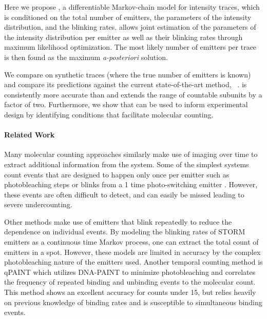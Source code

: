Here we propose \ours, a differentiable Markov-chain model for intensity
traces, which is conditioned on the total number of emitters, the parameters of
the intensity distribution, and the blinking rates.
%
  \ours allows joint estimation of the parameters of the intensity distribution
  per emitter as well as their blinking rates through maximum likelihood
  optimization.
  The most likely number of emitters per trace is then found as the maximum
  \emph{a-posteriori} solution.

We compare \ours on synthetic traces (where the true number of emitters is
known) and compare its predictions against the current state-of-the-art method,
\lbfcs~\citep{stein_calibration-free_2021}.
%
  \ours is consistently more accurate than \lbfcs and extends the range of
  countable subunits by a factor of two.
  Furthermore, we show that \ours can be used to inform experimental design by
  identifying conditions that facilitate molecular counting.

\paragraph{Related Work}

Many molecular counting approaches similarly
  make use of imaging over time to extract additional information from the
  system. Some of the simplest systems count events that are designed to happen
  only once per emitter such as photobleaching steps \cite{Ulbrich_subunit_2007} or
  blinks from a 1 time photo-switching emitter
  \cite{gunzenhauser_quantitative_2012}. However, these events are often difficult to
  detect, and can easily be missed leading to severe undercounting.

Other methods make use of emitters that blink repeatedly to reduce the
dependence on individual events.
%
  By modeling the blinking rates of STORM emitters as a continuous time
  Markov process, \cite{patel_blinking_2021, rollins_stochastic_2015} one can extract the total count of emitters
  in a spot. However, these models are limited in accuracy by the complex
  photobleaching nature of the emitters used. Another temporal counting method is
  qPAINT \cite{jungmann_quantitative_2016} which utilizes DNA-PAINT to minimize photobleaching and
  correlates the frequency of repeated binding and unbinding events to the
  molecular count. This method shows an excellent accuracy for counts under 15,
  but relies heavily on previous knowledge of binding rates and is
  susceptible to simultaneous binding events.

